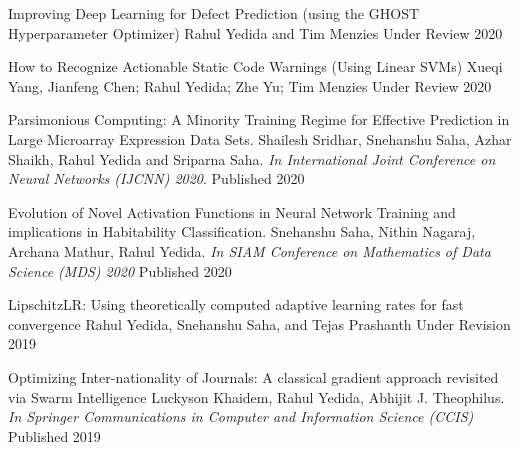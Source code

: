 


\begin{cvhonors}

    \cvhonor
        {Improving Deep Learning for Defect Prediction (using the GHOST Hyperparameter Optimizer)}
        {Rahul Yedida and Tim Menzies}
        {Under Review}
        {2020}

    \cvhonor
        {How to Recognize Actionable Static Code Warnings (Using Linear SVMs)}
        {Xueqi Yang, Jianfeng Chen; Rahul Yedida; Zhe Yu; Tim Menzies}
        {Under Review}
        {2020}

    \cvhonor
        {Parsimonious Computing: A Minority Training Regime for Effective Prediction in Large Microarray Expression Data Sets.}
        {Shailesh Sridhar, Snehanshu Saha, Azhar Shaikh, Rahul Yedida and Sriparna Saha.  \textit{In International Joint Conference on Neural Networks (IJCNN) 2020}.}
        {Published}
        {2020}

    \cvhonor
        {Evolution of Novel Activation Functions in Neural Network Training and implications in Habitability Classification.}
        {Snehanshu Saha, Nithin Nagaraj, Archana Mathur, Rahul Yedida. \textit{In SIAM Conference on Mathematics of Data Science (MDS) 2020}}
        {Published}
        {2020}

  \cvhonor
    {LipschitzLR: Using theoretically computed adaptive learning rates for fast convergence}
    {Rahul Yedida, Snehanshu Saha, and Tejas Prashanth}
    {Under Revision} %
    {2019} %

  \cvhonor
    {Optimizing Inter-nationality of Journals: A classical gradient approach revisited via Swarm Intelligence}
    {Luckyson Khaidem, Rahul Yedida, Abhijit J. Theophilus. \textit{In Springer Communications in Computer and Information Science (CCIS)}}
    {Published} %
    {2019} %
    
\end{cvhonors}